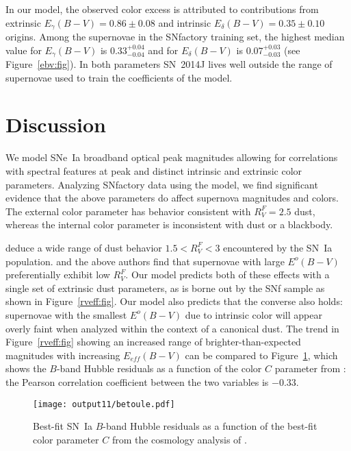 \documentclass{aastex}   	%
\begin{document}
In our model, the observed color excess is attributed to contributions from extrinsic
$E_\gamma(B-V)=  0.86 \pm   0.08$ and intrinsic $E_\delta(B-V)=  0.35 \pm   0.10$ origins.
Among the supernovae in the SNfactory training set, the highest median value for 
$E_\gamma(B-V)$ is $  0.33^{  +0.04}_{ -0.04}$ and for $E_\delta(B-V)$ is
$  0.07^{  +0.03}_{ -0.03}$ 
(see Figure~\ref{ebv:fig}).
In both parameters SN~2014J lives well outside the range of supernovae used to train the coefficients of the model.

\section{Discussion}
\label{discussion:sec}
We model SNe~Ia broadband optical peak magnitudes allowing for correlations with spectral features at peak and distinct intrinsic and
extrinsic color parameters.  Analyzing SNfactory data using the model, we find significant evidence that the above parameters do
affect supernova magnitudes and colors.  The external color parameter has behavior consistent with $R^F_V=2.5$ \citet{1999PASP..111...63F} dust,
whereas the internal color parameter is inconsistent with dust or a blackbody.

\citet{2014ApJ...789...32B, 2015MNRAS.453.3300A} deduce a wide range of dust behavior $1.5<R^F_V<3$ encountered by the SN~Ia population.
\citet{2011ApJ...729...55F} and the above authors
find that supernovae with large $E^o(B-V)$ 
preferentially exhibit low $R^F_V$. 
Our model predicts both of these effects with a single set of extrinsic dust parameters, as is borne out by the
SNf sample as shown in Figure~\ref{rveff:fig}. 
Our model also predicts that the converse also holds: supernovae with the smallest $E^o(B-V)$ due to intrinsic color
will appear overly faint when analyzed within the context of a canonical dust.
The trend in Figure~\ref{rveff:fig} showing an increased range of brighter-than-expected magnitudes  with increasing $E_{eff}(B-V)$  can
be compared
to Figure~\ref{betoule:fig}, which shows the $B$-band  Hubble residuals as a function of the color $C$ parameter from \citet{2014A&A...568A..22B}:
the Pearson correlation coefficient between the two variables is $-0.33$.

\begin{figure}[htbp] %
   \centering
   \texttt{[image: output11/betoule.pdf]} 
   \caption{Best-fit SN~Ia  $B$-band Hubble residuals as a function of the best-fit color parameter $C$ from the cosmology analysis of \citet{2014A&A...568A..22B}.
   \label{betoule:fig}}
\end{figure}
\end{document}
